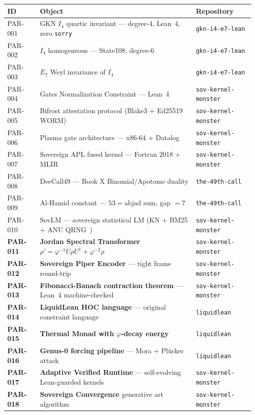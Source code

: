 \documentclass[12pt, letterpaper]{article}
\theoremstyle{plain}
\theoremstyle{definition}
\theoremstyle{remark}
\newcommand{\phiinv}{\varphi^{-1}}
\newcommand{\phiinvsq}{\varphi^{-2}}
\begin{document}
\begin{priorartbox}
\begin{tabular}{@{}lll@{}}
\toprule
\textbf{ID} & \textbf{Object} & \textbf{Repository} \\
\midrule
PAR-001 & GKN $I_4$ quartic invariant --- degree-4, Lean~4, zero \texttt{sorry} & \texttt{gkn-i4-e7-lean} \\
PAR-002 & $I_4$ homogeneous --- State108, degree-6 & \texttt{gkn-i4-e7-lean} \\
PAR-003 & $E_7$ Weyl invariance of $I_4$ & \texttt{gkn-i4-e7-lean} \\
PAR-004 & Gates Normalization Constraint --- Lean~4 & \texttt{sov-kernel-monster} \\
PAR-005 & Bifrost attestation protocol (Blake3 + Ed25519 WORM) & \texttt{sov-kernel-monster} \\
PAR-006 & Plasma gate architecture --- x86-64 + Datalog & \texttt{sov-kernel-monster} \\
PAR-007 & Sovereign APL fused kernel --- Fortran 2018 + MLIR & \texttt{sov-kernel-monster} \\
PAR-008 & DeeCall49 --- Book X Binomial/Apotome duality & \texttt{the-49th-call} \\
PAR-009 & Al-Hamid constant --- $53 = \text{abjad sum}$, gap $= 7$ & \texttt{the-49th-call} \\
PAR-010 & SovLM --- sovereign statistical LM (KN + BM25 + ANU QRNG~\cite{anu_qrng}) & \texttt{sov-kernel-monster} \\
\textbf{PAR-011} & \textbf{Jordan Spectral Transformer} $\rho' = \phiinv U\rho U^\dagger + \phiinvsq\rho$ & \texttt{sov-kernel-monster} \\
\textbf{PAR-012} & \textbf{Sovereign Piper Encoder} --- tight frame round-trip & \texttt{sov-kernel-monster} \\
\textbf{PAR-013} & \textbf{Fibonacci-Banach contraction theorem} --- Lean~4 machine-checked & \texttt{sov-kernel-monster} \\
\textbf{PAR-014} & \textbf{LiquidLean HOC language} --- original constraint language & \texttt{liquidlean} \\
\textbf{PAR-015} & \textbf{Thermal Monad with $\varphi$-decay energy} & \texttt{liquidlean} \\
\textbf{PAR-016} & \textbf{Genus-0 forcing pipeline} --- Mora + Pl\"{u}cker attack & \texttt{liquidlean} \\
\textbf{PAR-017} & \textbf{Adaptive Verified Runtime} --- self-evolving Lean-guarded kernels & \texttt{sov-kernel-monster} \\
\textbf{PAR-018} & \textbf{Sovereign Convergence} generative art algorithm & \texttt{sov-kernel-monster} \\
\bottomrule
\end{tabular}
\end{priorartbox}
\end{document}
